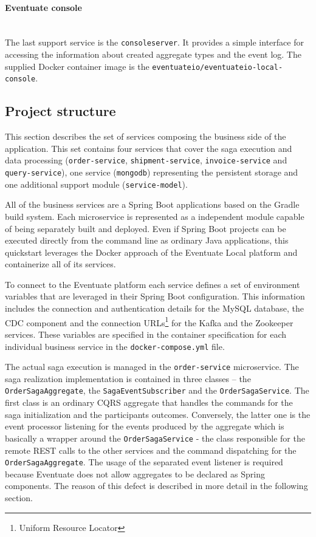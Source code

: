 \documentclass[oneside,
  digital, %
  table,   %
  nolof,     %
  nolot,     %
]{fithesis3}
\newcommand{\newlinepar}[1]{\paragraph{#1}\needspace{4\baselineskip}\mbox{}\\}
\begin{document}
\newlinepar{Eventuate console}

The last support service is the \texttt{consoleserver}. It provides a simple interface for accessing the information about created aggregate types and the event log. The supplied Docker container image is the \texttt{eventuateio/eventuateio-local-console}.


\subsection{Project structure}

This section describes the set of services composing the business side of the application. This set contains four services that cover the saga execution and data processing (\texttt{order-service}, \texttt{shipment-service}, \texttt{invoice-service} and \texttt{query-service}), one service (\texttt{mongodb}) representing the persistent storage and one additional support module (\texttt{service-model}).

All of the business services are a Spring Boot applications based on the Gradle \cite{gradle} build system. Each microservice is represented as a independent module capable of being separately built and deployed. Even if Spring Boot projects can be executed directly from the command line as ordinary Java applications, this quickstart leverages the Docker approach of the Eventuate Local platform and containerize all of its services.

To connect to the Eventuate platform each service defines a set of environment variables that are leveraged in their Spring Boot configuration. This information includes the connection and authentication details for the MySQL database, the CDC component and the connection URLs\footnote{Uniform Resource Locator} for the Kafka and the Zookeeper services. These variables are specified in the container specification for each individual business service in the \texttt{docker-compose.yml} file.

The actual saga execution is managed in the \texttt{order-service} microservice. The saga realization implementation is contained in three classes -- the \texttt{OrderSagaAggregate}, the \texttt{SagaEventSubscriber} and the \texttt{OrderSagaService}. The first class is an ordinary CQRS aggregate that handles the commands for the saga initialization and the participants outcomes. Conversely, the latter one is the event processor listening for the events produced by the aggregate which is basically a wrapper around the \texttt{OrderSagaService} - the class responsible for the remote REST calls to the other services and the command dispatching for the \texttt{OrderSagaAggregate}. The usage of the separated event listener is required because Eventuate does not allow aggregates to be declared as Spring components. The reason of this defect is described in more detail in the following section.
\end{document}
